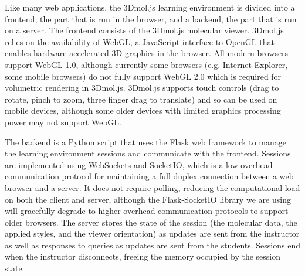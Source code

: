 \documentclass[journal=jceda8,manuscript=article]{achemso}
\begin{document}
Like many web applications, the 3Dmol.js learning environment is divided into a frontend, the part that is run in the browser, and a backend, the part that is run on a server.  The frontend consists of the 3Dmol.js molecular viewer.
3Dmol.js relies on the availability of WebGL, a JavaScript interface to OpenGL that enables hardware accelerated 3D graphics in the browser.  All modern browsers support WebGL 1.0, although currently some browsers (e.g. Internet Explorer, some mobile browsers) do not fully support WebGL 2.0 which is required for volumetric rendering in 3Dmol.js.  3Dmol.js supports touch controls (drag to rotate, pinch to zoom, three finger drag to translate) and so can be used on mobile devices, although some older devices with limited graphics processing power may not support WebGL.

The backend is a Python script that uses the Flask\cite{flask} web framework to manage the learning environment sessions and communicate with the frontend.
Sessions are implemented using WebSockets and SocketIO,\cite{socketio,flasksocketio} which is a low overhead communication protocol for maintaining a full duplex connection between a web browser and a server.  It does not require polling, reducing the computational load on both the client and server, although the Flask-SocketIO library we are using will gracefully degrade to higher overhead communication protocols to support older browsers.  The server stores the state of the session (the molecular data, the applied styles, and the viewer orientation) as updates are sent from the instructor as well as responses to queries as updates are sent from the students.  Sessions end when the instructor disconnects, freeing the memory occupied by the session state.
\end{document}
